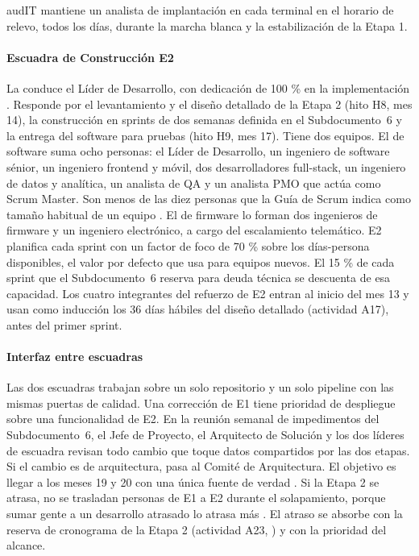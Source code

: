 \begin{compromiso}[metrica={35 turnos de relevo por semana cubiertos en los cinco terminales, de la capacitación previa a la marcha blanca hasta el fin de la estabilización de la Etapa 1},
                   verifica={registro semanal de turnos firmado por el jefe de cada terminal},
                   fuente={\caso{numeral 13.3}{27}}]
audIT mantiene un analista de implantación en cada terminal en el horario de relevo, todos los días, durante la marcha blanca y la estabilización de la Etapa 1.
\end{compromiso}

\paragraph{Escuadra de Construcción E2}
La conduce el Líder de Desarrollo, con dedicación de 100 \% en la implementación
. Responde por el levantamiento y el diseño detallado de la Etapa 2 (hito H8,
mes 14), la construcción en sprints de dos semanas definida en el Subdocumento~6 y la entrega del
software para pruebas (hito H9, mes 17). Tiene dos equipos. El de software suma ocho personas: el Líder
de Desarrollo, un ingeniero de software sénior, un ingeniero frontend y móvil, dos desarrolladores
full-stack, un ingeniero de datos y analítica, un analista de QA y un analista PMO que actúa como Scrum
Master. Son menos de las diez personas que la Guía de Scrum indica como tamaño habitual de un equipo
\parencite{schwaber2020}. El de firmware lo forman dos ingenieros de firmware y un ingeniero
electrónico, a cargo del escalamiento telemático. E2 planifica cada sprint con un factor de foco de
70 \% sobre los días-persona disponibles, el valor por defecto que \textcite{kniberg2015} usa para
equipos nuevos. El 15 \% de cada sprint que el Subdocumento~6 reserva para deuda técnica se descuenta
de esa capacidad. Los cuatro integrantes del refuerzo de E2 entran al inicio del mes 13 y usan como
inducción los 36 días hábiles del diseño detallado (actividad A17), antes del primer sprint.

\paragraph{Interfaz entre escuadras}
Las dos escuadras trabajan sobre un solo repositorio y un solo pipeline con las mismas puertas de
calidad. Una corrección de E1 tiene prioridad de despliegue sobre una funcionalidad de E2. En la
reunión semanal de impedimentos del Subdocumento~6, el Jefe de Proyecto, el Arquitecto de Solución y
los dos líderes de escuadra revisan todo cambio que toque datos compartidos por las dos etapas. Si el
cambio es de arquitectura, pasa al Comité de Arquitectura. El objetivo es llegar a los meses 19 y 20
con una única fuente de verdad . Si la Etapa 2 se atrasa, no se trasladan personas de
E1 a E2 durante el solapamiento, porque sumar gente a un desarrollo atrasado lo atrasa más
\parencite{brooks1975}. El atraso se absorbe con la reserva de cronograma de la Etapa 2 (actividad
A23, ) y con la prioridad del alcance.

